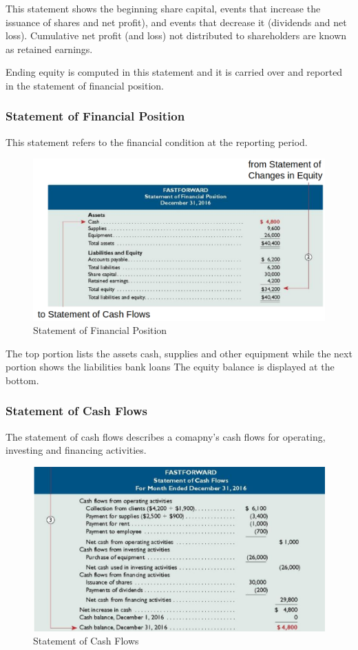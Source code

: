 \documentclass[../main.tex]{subfiles}
\begin{document}
	This statement shows the beginning share 
	capital, events that increase the issuance of shares and net profit), and 
	events that decrease it (dividends and net loss). Cumulative net profit 
	(and loss) not distributed to shareholders are known as retained earnings. 
	
	Ending equity is computed in this statement and it is carried over and 
	reported in the statement of financial position.
	
	\subsubsection{Statement of Financial Position}
	This statement refers to the financial condition at the reporting period. 
	
	\begin{figure}[ht!]
		\centering
		\includegraphics[width=1\columnwidth]{images/c1/statement_of_financial_position.png}
		\caption{Statement of Financial Position}
	\end{figure}
	The top portion lists the assets \ie cash, supplies and other 
	equipment while the next portion shows the liabilities \eg bank loans \etc 
	The equity balance is displayed at the bottom. 
	
	\subsubsection{Statement of Cash Flows}
	
	The statement of cash flows describes a comapny's cash flows for operating, 
	investing and financing activities. 
	\begin{figure}[ht!]
		\centering
		\includegraphics[width=1\columnwidth]{images/c1/statement_of_cash_flows.png}
		\caption{Statement of Cash Flows}
	\end{figure}
	
\end{document}
